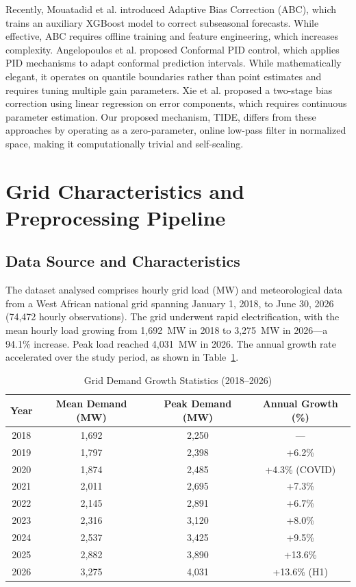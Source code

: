 \documentclass[journal]{IEEEtran}
\begin{document}
Recently, Mouatadid et al. \cite{mouatadid2023} introduced Adaptive Bias Correction (ABC), which trains an auxiliary XGBoost model to correct subseasonal forecasts. While effective, ABC requires offline training and feature engineering, which increases complexity. Angelopoulos et al. \cite{angelopoulos2023} proposed Conformal PID control, which applies PID mechanisms to adapt conformal prediction intervals. While mathematically elegant, it operates on quantile boundaries rather than point estimates and requires tuning multiple gain parameters. Xie et al. \cite{xie2025} proposed a two-stage bias correction using linear regression on error components, which requires continuous parameter estimation. Our proposed mechanism, TIDE, differs from these approaches by operating as a zero-parameter, online low-pass filter in normalized space, making it computationally trivial and self-scaling.

\section{Grid Characteristics and Preprocessing Pipeline}

\subsection{Data Source and Characteristics}
The dataset analysed comprises hourly grid load (MW) and meteorological data from a West African national grid spanning January 1, 2018, to June 30, 2026 (74,472 hourly observations). The grid underwent rapid electrification, with the mean hourly load growing from 1,692~MW in 2018 to 3,275~MW in 2026---a 94.1\% increase. Peak load reached 4,031~MW in 2026. The annual growth rate accelerated over the study period, as shown in Table~\ref{tab:growth_stats}.

\begin{table}[htbp]
\caption{Grid Demand Growth Statistics (2018--2026)}
\label{tab:growth_stats}
\centering
\begin{tabular}{cccc}
\toprule
\textbf{Year} & \textbf{Mean Demand (MW)} & \textbf{Peak Demand (MW)} & \textbf{Annual Growth (\%)} \\
\midrule
2018 & 1,692 & 2,250 & --- \\
2019 & 1,797 & 2,398 & +6.2\% \\
2020 & 1,874 & 2,485 & +4.3\% (COVID) \\
2021 & 2,011 & 2,695 & +7.3\% \\
2022 & 2,145 & 2,891 & +6.7\% \\
2023 & 2,316 & 3,120 & +8.0\% \\
2024 & 2,537 & 3,425 & +9.5\% \\
2025 & 2,882 & 3,890 & +13.6\% \\
2026 & 3,275 & 4,031 & +13.6\% (H1) \\
\bottomrule
\end{tabular}
\end{table}
\end{document}
